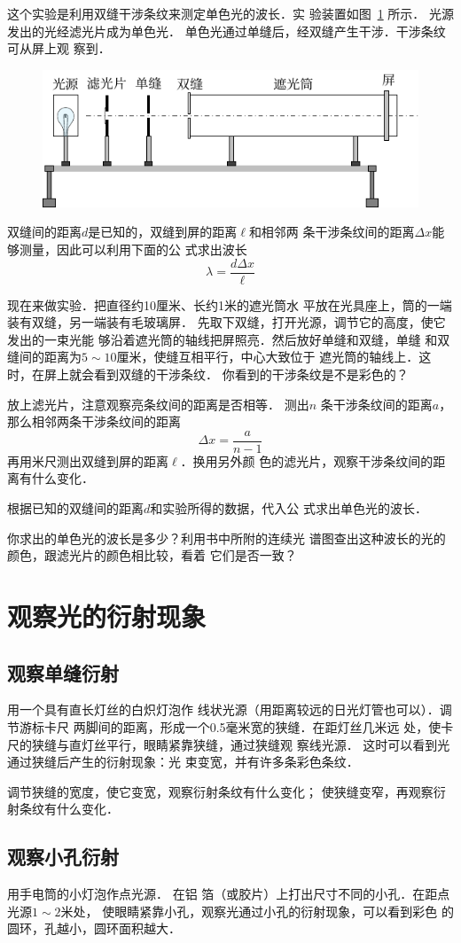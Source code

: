 这个实验是利用双缝干涉条纹来测定单色光的波长．实
验装置如图~\ref{fig_C_10-9} 所示．
光源发出的光经滤光片成为单色光．
单色光通过单缝后，经双缝产生干涉．干涉条纹可从屏上观
察到．
\begin{figure}[htbp]
    \centering
    \includegraphics{fig/C/10-9.pdf}
    \caption{}\label{fig_C_10-9}
\end{figure}

双缝间的距离$d$是已知的，双缝到屏的距离$\ell$和相邻两
条干涉条纹间的距离$\Delta x$能够测量，因此可以利用下面的公
式求出波长
\[\lambda=\frac{d\Delta x}{\ell} \]

现在来做实验．把直径约10厘米、长约1米的遮光筒水
平放在光具座上，筒的一端装有双缝，另一端装有毛玻璃屏．
先取下双缝，打开光源，调节它的高度，使它发出的一束光能
够沿着遮光筒的轴线把屏照亮．然后放好单缝和双缝，单缝
和双缝间的距离为$5 \sim 10$厘米，使缝互相平行，中心大致位于
遮光筒的轴线上．这时，在屏上就会看到双缝的干涉条纹．
你看到的干涉条纹是不是彩色的？

放上滤光片，注意观察亮条纹间的距离是否相等．
测出$n$
条干涉条纹间的距离$a$，那么相邻两条干涉条纹间的距离
\[\Delta x=\frac{a}{n-1} \]
再用米尺测出双缝到屏的距离$\ell$．换用另外颜
色的滤光片，观察干涉条纹间的距离有什么变化．

根据已知的双缝间的距离$d$和实验所得的数据，代入公
式求出单色光的波长．

你求出的单色光的波长是多少？利用书中所附的连续光
谱图查出这种波长的光的颜色，跟滤光片的颜色相比较，看着
它们是否一致？

\section{观察光的衍射现象}

\subsection{观察单缝衍射}

用一个具有直长灯丝的白炽灯泡作
线状光源（用距离较远的日光灯管也可以）．调节游标卡尺
两脚间的距离，形成一个0.5毫米宽的狭缝．在距灯丝几米远
处，使卡尺的狭缝与直灯丝平行，眼睛紧靠狭缝，通过狭缝观
察线光源．
这时可以看到光通过狭缝后产生的衍射现象：光
束变宽，并有许多条彩色条纹．

调节狭缝的宽度，使它变宽，观察衍射条纹有什么变化；
使狭缝变窄，再观察衍射条纹有什么变化．

\subsection{观察小孔衍射}

用手电筒的小灯泡作点光源．
在铝
箔（或胶片）上打出尺寸不同的小孔．在距点光源$1 \sim 2$米处，
使眼睛紧靠小孔，观察光通过小孔的衍射现象，可以看到彩色
的圆环，孔越小，圆环面积越大．

